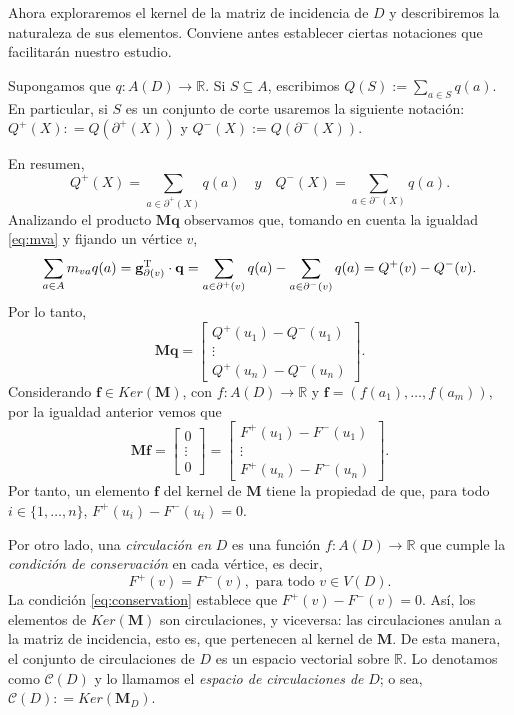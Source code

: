 Ahora exploraremos el kernel de la matriz de incidencia de $D$ y describiremos la naturaleza de sus elementos. Conviene antes establecer ciertas notaciones que facilitarán nuestro estudio. 

Supongamos que $q \colon A(D) \rightarrow \mathbb{R}$. Si $S\subseteq A$, escribimos $Q(S):= \sum_{a \in S} q(a)$. En particular, si $S$ es un conjunto de corte usaremos la siguiente notación: $Q^{+}(X): = Q(\partial^{+}(X))$ y $Q^{-}(X):=Q(\partial^{-}(X))$.
  
En resumen,
$$
Q^{+}(X) =  \sum_{a \in \partial^{+}(X)} q(a) \quad y \quad
Q^{-}(X) = \sum_{a \in \partial^{-}(X)} q(a). 
$$
Analizando el producto $\mathbf{M}\mathbf{q}$ observamos que, tomando en cuenta la igualdad \ref{eq:mva} y fijando un vértice $v$, 
$$
\sum_{a \in A} m_{va}q(a) = \mathbf{g}_{\partial(v)}^{\textnormal{T}} \cdot \mathbf{q} = \sum_{a \in \partial^{+}(v)} q(a) - \sum_{a \in \partial^{-}(v)} q(a) = Q^{+}(v) - Q^{-}(v).
$$
Por lo tanto,
$$
\mathbf{M}\mathbf{q}=
    \begin{bmatrix}
Q^{+}(u_{1}) - Q^{-}(u_{1})\\ 
\vdots \\
Q^{+}(u_{n}) - Q^{-}(u_{n}) 
\end{bmatrix}.
$$
Considerando $\mathbf{f} \in Ker(\mathbf{M})$, con $f \colon A(D) \rightarrow \mathbb{R}$ y $\mathbf{f} = (f(a_{1}), \ldots, f(a_{m}))$, por la igualdad anterior vemos que 
$$
\mathbf{M}\mathbf{f}= 
\begin{bmatrix}
0 \\
\vdots\\
0
\end{bmatrix}= 
\begin{bmatrix}
F^{+}(u_{1}) - F^{-}(u_{1})\\
\vdots \\
F^{+}(u_{n}) - F^{-}(u_{n}) 
\end{bmatrix}.
$$
Por tanto, un elemento $\mathbf{f}$ del kernel de $\mathbf{M}$ tiene la propiedad de que, para todo $i \in \{1,\ldots, n\}$, $F^{+}(u_{i}) - F^{-}(u_{i}) = 0$.

Por otro lado, una \textit{circulación en} $D$ es una función $f \colon A(D) \rightarrow \mathbb{R}$ que cumple la \textit{condición de conservación} en cada vértice, es decir, 
\begin{equation} \label{eq:conservation}
    F^{+}(v) = F^{-}(v), \text{ para todo }v \in V(D).
\end{equation}
La condición \ref{eq:conservation} establece que $F^{+}(v) - F^{-}(v) = 0$. Así, los elementos de $Ker(\mathbf{M})$ son circulaciones, y viceversa: las circulaciones anulan a la matriz de incidencia, esto es, que pertenecen al kernel de $\mathbf{M}$. De esta manera, el conjunto de circulaciones de $D$ es un espacio vectorial sobre $\mathbb{R}$. Lo denotamos como $\mathcal{C}(D)$ y lo llamamos el \textit{espacio de circulaciones de} $D$; o sea, $\mathcal{C}(D) : = Ker(\mathbf{M}_{D})$. 

